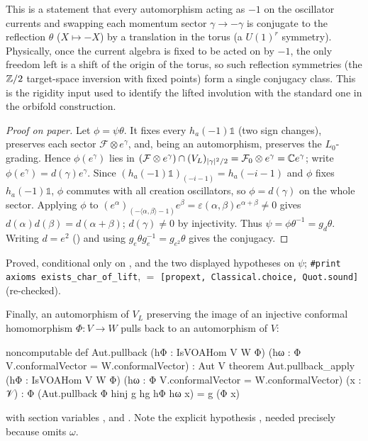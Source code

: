 \begin{physics}
This is a statement that every automorphism acting as $-1$ on the oscillator currents and swapping each momentum sector $\gamma\to-\gamma$ is conjugate to the reflection $\theta$ ($X\mapsto-X$) by a translation in the torus (a $U(1)^r$ symmetry). Physically, once the current algebra is fixed to be acted on by $-1$, the only freedom left is a shift of the origin of the torus, so such reflection symmetries (the ${\mathbb{Z}}/2$ target-space inversion with fixed points) form a single conjugacy class. This is the rigidity input used to identify the lifted involution with the standard one in the orbifold construction.
\end{physics}

\begin{proof}[Proof on paper]
Let $\phi=\psi\theta$. It fixes every $h_a(-1)\mathbb 1$ (two sign changes), preserves each sector
$\mathcal F\otimes e^\gamma$, and, being an automorphism, preserves the $L_0$-grading. Hence
$\phi(e^\gamma)$ lies in $(\mathcal F\otimes e^\gamma)\cap(V_L)_{|\gamma|^2/2}=\mathcal F_0\otimes
e^\gamma={\mathbb{C}} e^\gamma$; write $\phi(e^\gamma)=d(\gamma)e^\gamma$. Since $(h_a(-1)\mathbb
1)_{(-i-1)}=h_a(-i-1)$ and $\phi$ fixes $h_a(-1)\mathbb 1$, $\phi$ commutes with all creation
oscillators, so $\phi=d(\gamma)$ on the whole sector. Applying $\phi$ to
$(e^\alpha)_{(-\langle\alpha,\beta\rangle-1)}e^\beta=\varepsilon(\alpha,\beta)e^{\alpha+\beta}\neq0$
gives $d(\alpha)d(\beta)=d(\alpha+\beta)$; $d(\gamma)\neq0$ by injectivity. Thus $\psi=\phi\theta^{-1}
=g_d\theta$. Writing $d=e^2$ () and using $g_e\theta g_e^{-1}=g_{e^2}\theta$
gives the conjugacy.
\end{proof}

\begin{status}
Proved, conditional only on ,  and the two displayed hypotheses on $\psi$;
\texttt{\#print axioms exists\_char\_of\_lift},  $=$
\texttt{[propext, Classical.choice, Quot.sound]} (re-checked).
\end{status}

Finally, an automorphism of $V_L$ preserving the image of an injective conformal homomorphism
$\Phi\colon V\to W$ pulls back to an automorphism of $V$:
\begin{leancode}
noncomputable def Aut.pullback (hΦ : IsVOAHom V W Φ)
    (hω : Φ V.conformalVector = W.conformalVector) : Aut V
theorem Aut.pullback_apply (hΦ : IsVOAHom V W Φ)
    (hω : Φ V.conformalVector = W.conformalVector) (x : 𝒱) :
    Φ (Aut.pullback Φ hinj g hg hΦ hω x) = g (Φ x)
\end{leancode}
with section variables ,  and
. Note the
explicit hypothesis , needed precisely because  omits $\omega$.

